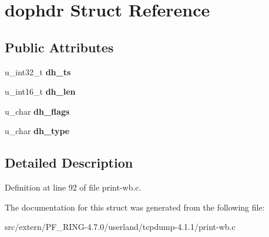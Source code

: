 \hypertarget{structdophdr}{
\section{dophdr Struct Reference}
\label{structdophdr}
}
\subsection*{Public Attributes}
\begin{DoxyCompactItemize}
\item 
\hypertarget{structdophdr_abedc83434f5febc05db9fb5880aa6ee3}{
u\_\-int32\_\-t {\bfseries dh\_\-ts}}
\label{structdophdr_abedc83434f5febc05db9fb5880aa6ee3}

\item 
\hypertarget{structdophdr_a824e9059aef0c1a2cdc58585ee348172}{
u\_\-int16\_\-t {\bfseries dh\_\-len}}
\label{structdophdr_a824e9059aef0c1a2cdc58585ee348172}

\item 
\hypertarget{structdophdr_a07fdab2298707889d45b7190c58217fc}{
u\_\-char {\bfseries dh\_\-flags}}
\label{structdophdr_a07fdab2298707889d45b7190c58217fc}

\item 
\hypertarget{structdophdr_a26932dc07c13190fcb3ce93910048a31}{
u\_\-char {\bfseries dh\_\-type}}
\label{structdophdr_a26932dc07c13190fcb3ce93910048a31}

\end{DoxyCompactItemize}


\subsection{Detailed Description}


Definition at line 92 of file print-\/wb.c.



The documentation for this struct was generated from the following file:\begin{DoxyCompactItemize}
\item 
src/extern/PF\_\-RING-\/4.7.0/userland/tcpdump-\/4.1.1/print-\/wb.c\end{DoxyCompactItemize}

